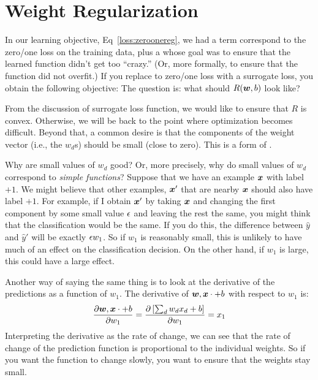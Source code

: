 \section{Weight Regularization}

In our learning objective, Eq~\eqref{loss:zeroonereg}, we had a term
correspond to the zero/one loss on the training data, plus a
 whose goal was to ensure that the learned
function didn't get too ``crazy.''  (Or, more formally, to ensure that
the function did not overfit.)  If you replace to zero/one loss with a
surrogate loss, you obtain the following objective:
%
%
The question is: what should $R({\boldsymbol{w}},b)$ look like?

From the discussion of surrogate loss function, we would like to
ensure that $R$ is convex.  Otherwise, we will be back to the point
where optimization becomes difficult.  Beyond that, a common desire is
that the components of the weight vector (i.e., the $w_d$s) should be
small (close to zero).  This is a form of .

Why are small values of $w_d$ good?  Or, more precisely, why do small
values of $w_d$ correspond to \emph{simple functions}?  Suppose that
we have an example ${\boldsymbol{x}}$ with label $+1$.  We might believe that other
examples, ${\boldsymbol{x}}'$ that are nearby ${\boldsymbol{x}}$ should also have label $+1$.
For example, if I obtain ${\boldsymbol{x}}'$ by taking ${\boldsymbol{x}}$ and changing the first
component by some small value $\epsilon$ and leaving the rest the same, you
might think that the classification would be the same.  If you do
this, the difference between $\hat y$ and $\hat y'$ will be exactly
$\epsilon w_1$.  So if $w_1$ is reasonably small, this is unlikely to have
much of an effect on the classification decision.  On the other hand,
if $w_1$ is large, this could have a large effect.

Another way of saying the same thing is to look at the derivative of
the predictions as a function of $w_1$.  The derivative of
${\boldsymbol{w}},{\boldsymbol{x}} \cdot +b$ with respect to $w_1$ is:
\begin{equation}
\frac {\partial {\boldsymbol{w}},{\boldsymbol{x}} \cdot +b} {\partial w_1}
= \frac {\partial \left[\sum_d w_d x_d+b\right]} {\partial w_1}
= x_1
\end{equation}
Interpreting the derivative as the rate of change, we can see that the
rate of change of the prediction function is proportional to the
individual weights.  So if you want the function to change slowly, you
want to ensure that the weights stay small.

